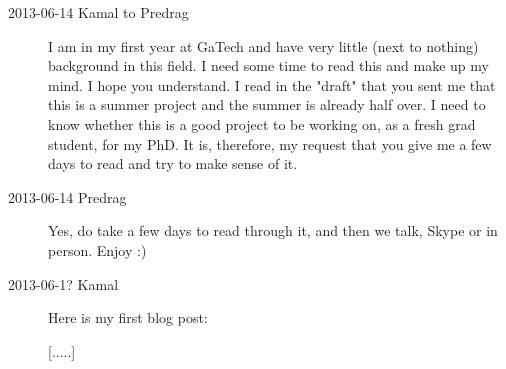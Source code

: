 \begin{description}
\item[2013-06-14 Kamal to Predrag] I am in my first year
    at GaTech and have very little (next to nothing) background in this
    field. I need some time to read this and make up my mind. I hope
    you understand. I read in the "draft" that you sent me that this is a
    summer project and the summer is already half over. I need to know
    whether this is a good project to be working on, as a fresh grad
    student, for my PhD. It is, therefore, my request that you give me
    a few days to read and try to make sense of it.

\item[2013-06-14 Predrag]
Yes, do take a few days to read through it, and then we talk, Skype or in person.
Enjoy :)

\item[2013-06-1? Kamal] Here is my first blog post:

[.....]


\end{description}

\renewcommand{\ssp}{a}
